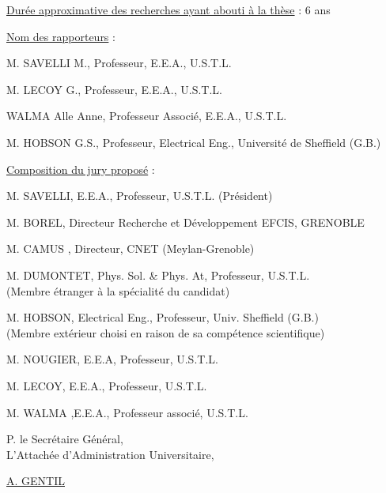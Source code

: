 \uline{Durée approximative des recherches ayant abouti à la thèse} : 6 ans

\uline{Nom des rapporteurs} :

M. SAVELLI M., Professeur, E.E.A., U.S.T.L.

M. LECOY G., Professeur, E.E.A., U.S.T.L.

 WALMA Alle Anne, Professeur Associé, E.E.A., U.S.T.L.

M. HOBSON G.S., Professeur, Electrical Eng., Université de Sheffield (G.B.)

\uline{Composition du jury proposé} :

M. SAVELLI, E.E.A., Professeur, U.S.T.L.  (Président)

M. BOREL, Directeur Recherche et Développement EFCIS, GRENOBLE

M. CAMUS , Directeur, CNET (Meylan-Grenoble)

M. DUMONTET, Phys. Sol. \& Phys. At, Professeur, U.S.T.L.\\
(Membre étranger à la spécialité du candidat)

M. HOBSON, Electrical Eng., Professeur, Univ. Sheffield (G.B.)\\
(Membre extérieur choisi en raison de sa compétence scientifique)

M. NOUGIER, E.E.A, Professeur, U.S.T.L.

M. LECOY, E.E.A., Professeur, U.S.T.L.

M. WALMA ,E.E.A., Professeur associé, U.S.T.L.

P. le Secrétaire Général,\\
L'Attachée d'Administration Universitaire,


\uline{A. GENTIL}

